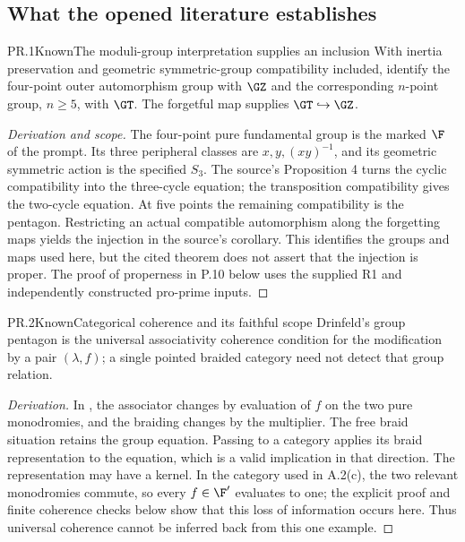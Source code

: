 \subsection{What the opened literature establishes}

\begin{statement}{PR.1}{Known}{The moduli-group interpretation supplies an inclusion}
With inertia preservation and geometric symmetric-group compatibility included,
\citet[Main Theorem and Corollary]{LitHarbaterSchneps2000} identify
the four-point outer automorphism group with $\GZ$ and the corresponding
$n$-point group, $n\ge5$, with $\GT$. The forgetful map supplies
$\GT\hookrightarrow\GZ$.
\end{statement}
\begin{proof}[Derivation and scope]
The four-point pure fundamental group is the marked $\F$ of the prompt.
Its three peripheral classes are $x,y,(xy)^{-1}$, and its geometric
symmetric action is the specified $S_3$. The source's Proposition 4
turns the cyclic compatibility into the three-cycle equation; the
transposition compatibility gives the two-cycle equation. At five
points the remaining compatibility is the pentagon. Restricting an
actual compatible automorphism along the forgetting maps yields the
injection in the source's corollary. This identifies the groups and
maps used here, but the cited theorem does not assert that the injection
is proper. The proof of properness in P.10 below uses the supplied R1
and independently constructed pro-prime inputs.
\end{proof}

\begin{statement}{PR.2}{Known}{Categorical coherence and its faithful scope}
Drinfeld's group pentagon is the universal associativity coherence
condition for the modification by a pair $(\lambda,f)$; a single
pointed braided category need not detect that group relation.
\end{statement}
\begin{proof}[Derivation]
In \citet[Section 4, equations (4.5), (4.10), (4.12), (4.13)]{LitDrinfeld1991},
the associator changes by evaluation of $f$ on the two pure monodromies,
and the braiding changes by the multiplier. The free braid situation
retains the group equation. Passing to a category applies its braid
representation to the equation, which is a valid implication in that
direction. The representation may have a kernel. In the category used
in A.2(c), the two relevant monodromies commute, so every $f\in\F'$
evaluates to one; the explicit proof and finite coherence checks below
show that this loss of information occurs here. Thus universal
coherence cannot be inferred back from this one example.
\end{proof}

